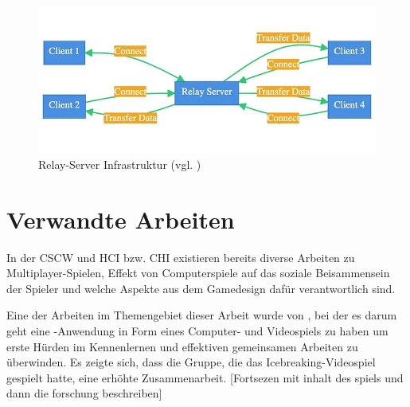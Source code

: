 \begin{figure}[ht]
\centering
\includegraphics[width=1\linewidth]{content/pictures/0_o7LJU1ImxPHIM5Ej.png}
\caption{Relay-Server Infrastruktur (vgl. \cite{mygames_unity_2024})}
\label{fig:relay-server}
\end{figure}


\chapter{Verwandte Arbeiten}
In der \ac{CSCW} und \ac{HCI} bzw. \ac{CHI} existieren bereits diverse Arbeiten zu Multiplayer-Spielen, Effekt von Computerspiele auf das soziale Beisammensein der Spieler und welche Aspekte aus dem Gamedesign dafür verantwortlich sind.

Eine der Arbeiten im Themengebiet dieser Arbeit wurde von \cite{nasir_effect_2015}, bei der es darum geht eine -Anwendung in Form eines Computer- und Videospiels zu haben um erste Hürden im Kennenlernen und effektiven gemeinsamen Arbeiten zu überwinden. Es zeigte sich, dass die Gruppe, die das Icebreaking-Videospiel gespielt hatte, eine erhöhte Zusammenarbeit. [Fortsezen mit inhalt des spiels und dann die forschung beschreiben]






